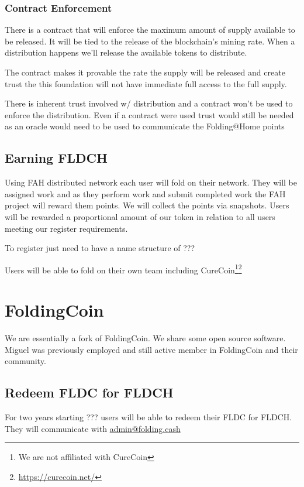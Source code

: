 \documentclass[letterpaper,12pt,titlepage]{article}
\makeatletter
\def\adminEmail{\href{mailto:admin@folding.cash}{admin@folding.cash}}
\def\ticker{FLDCH}
\def\curecoinWebsite{\url{https://curecoin.net/}}
\makeatother
\begin{document}
\subsubsection{Contract Enforcement}
There is a contract that will enforce the maximum amount of supply available to be released. It will be tied to the release of the blockchain's mining rate. When a distribution happens we'll release the available tokens to distribute.

The contract makes it provable the rate the supply will be released and create trust the this foundation will not have immediate full access to the full supply.

There is inherent trust involved w/ distribution and a contract won't be used to enforce the distribution. Even if a contract were used trust would still be needed as an oracle would need to be used to communicate the Folding@Home points

\subsection{Earning \ticker{}}
Using FAH distributed network each user will fold on their network. They will be assigned work and as they perform work and submit completed work the FAH project will reward them points. We will collect the points via snapshots. Users will be rewarded a proportional amount of our token in relation to all users meeting our register requirements.

To register just need to have a name structure of ???

Users will be able to fold on their own team including CureCoin\footnote{We are not affiliated with CureCoin}\footnote{\curecoinWebsite}

\section{FoldingCoin}
We are essentially a fork of FoldingCoin. We share some open source software. Miguel was previously employed and still active member in FoldingCoin and their community.

\subsection{Redeem FLDC for FLDCH}
For two years starting ??? users will be able to redeem their FLDC for FLDCH.
They will communicate with \adminEmail{}
\end{document}
